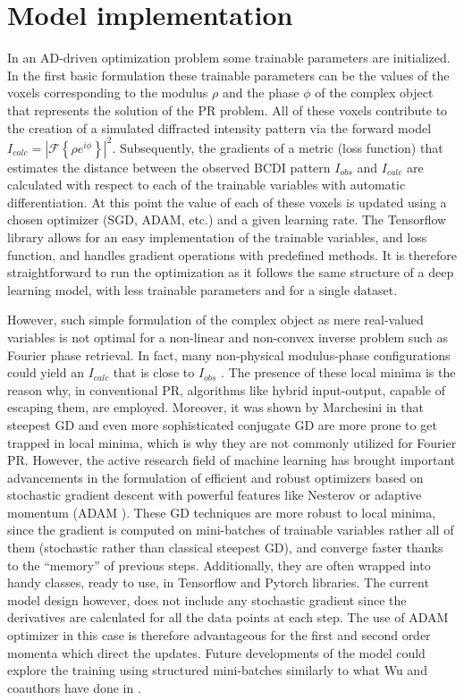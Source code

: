 \section{Model implementation}
In an AD-driven optimization problem some trainable parameters are initialized. In the first basic formulation these 
trainable parameters can be the values of the voxels corresponding to the modulus $\rho$ and the phase $\phi$ of the complex 
object that represents the solution of the PR problem. All of these voxels contribute to the creation of a simulated 
diffracted intensity pattern via the forward model $I_{calc} = |\mathcal{F}\left\{ \rho e^{i\phi} \right\}|^2$. Subsequently, 
the gradients of a metric (loss function) that estimates the distance between the observed BCDI pattern $I_{obs}$ and $I_{calc}$ 
are calculated with respect to each of the trainable variables with automatic differentiation. At this point the value 
of each of these voxels is updated using a chosen optimizer (SGD, ADAM, etc.) and a given learning rate. The Tensorflow 
library allows for an easy implementation of the trainable variables, and loss function, and handles gradient operations 
with predefined methods. It is therefore straightforward to run the optimization as it follows the same structure of 
a deep learning model, with less trainable parameters and for a single dataset. 

However, such simple formulation of the complex object as mere real-valued variables is not optimal for a non-linear and non-convex 
inverse problem such as Fourier phase retrieval. In fact, many non-physical modulus-phase configurations could yield an 
$I_{calc}$ that is close to  $I_{obs}$ \cite{favre-nicolin_free_2020}. The presence of these local minima is the reason why, in conventional PR, algorithms 
like hybrid input-output, capable of escaping them, are employed. 
Moreover, it was shown by Marchesini in \cite{marchesini_unified_2007}
that steepest GD and even more sophisticated conjugate GD are more prone to get trapped in local 
minima, which is why they are not commonly utilized for Fourier PR. However, the active research field of machine learning has 
brought important advancements in the formulation of efficient and robust optimizers based on stochastic gradient descent with 
powerful features like Nesterov or adaptive momentum (ADAM \cite{ADAM}). These GD techniques are more robust to local minima, 
since the gradient is computed on mini-batches of trainable variables rather all of them (stochastic rather than classical steepest GD), 
and converge faster thanks to the ``memory'' of previous steps. Additionally, they are often wrapped into handy classes, ready to use, 
in Tensorflow and Pytorch libraries. The current model design however, does not include any stochastic gradient since the 
derivatives are calculated for all the data points at each step. The use of ADAM optimizer in this case is therefore 
advantageous for the first and second order momenta which direct the updates. Future developments of the model could 
explore the training using structured mini-batches similarly to what Wu and coauthors have done in \cite{tagaki_2025}. 


